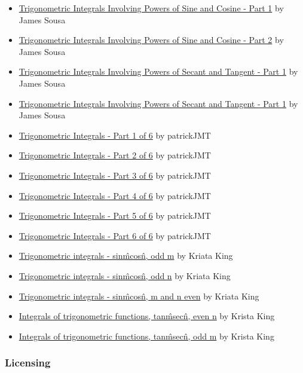 \begin{itemize}
    \item \href{https://youtu.be/Sv-bSbAQeXc}{Trigonometric Integrals Involving Powers of Sine and Cosine - Part 1} by James Sousa
    \item \href{https://youtu.be/vPnuigP8I6I}{Trigonometric Integrals Involving Powers of Sine and Cosine - Part 2} by James Sousa
    \item \href{https://youtu.be/RGaDMqhOg8Y}{Trigonometric Integrals Involving Powers of Secant and Tangent - Part 1} by James Sousa
    \item \href{https://youtu.be/o8sIHlS17qc}{Trigonometric Integrals Involving Powers of Secant and Tangent - Part 1} by James Sousa
    \item \href{https://youtu.be/lTqnlihOC4o}{Trigonometric Integrals - Part 1 of 6} by patrickJMT
    \item \href{https://youtu.be/zyg9k1je7Fg}{Trigonometric Integrals - Part 2 of 6} by patrickJMT
    \item \href{https://youtu.be/BhJ4soojyAQ}{Trigonometric Integrals - Part 3 of 6} by patrickJMT
    \item \href{https://youtu.be/8CHHY-2Ctug}{Trigonometric Integrals - Part 4 of 6} by patrickJMT
    \item \href{https://youtu.be/QdNScjd5bno}{Trigonometric Integrals - Part 5 of 6} by patrickJMT
    \item \href{https://youtu.be/m3zG7c52QR4}{Trigonometric Integrals - Part 6 of 6} by patrickJMT
    \item \href{https://youtu.be/WYhyq_mTCZs}{Trigonometric integrals - sin\^mcos\^n, odd m} by Kriata King
    \item \href{https://youtu.be/RRDiT-djQPk}{Trigonometric integrals - sin\^mcos\^n, odd n} by Kriata King
    \item \href{https://youtu.be/rpbr2nH7lNY}{Trigonometric integrals - sin\^mcos\^n, m and n even} by Kriata King
    \item \href{https://youtu.be/CK2SfrzF_c4}{Integrals of trigonometric functions, tan\^msec\^n, even n} by Krista King
    \item \href{https://youtu.be/0TuZSSah5hc}{Integrals of trigonometric functions, tan\^msec\^n, odd m} by Krista King
\end{itemize}


\subsubsection{Licensing}
\label{sss:lice-7352}


